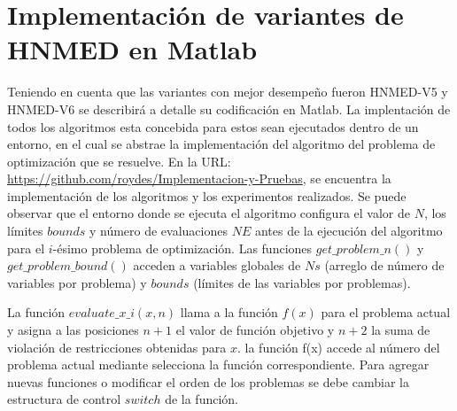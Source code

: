 
\chapter{Implementación de variantes de HNMED en Matlab} %

\label{AppendixA} %

Teniendo en cuenta que las variantes con mejor desempeño fueron HNMED-V5 y HNMED-V6 se describirá a detalle su codificación en Matlab. La implentación de todos los algoritmos esta concebida para estos sean ejecutados dentro de un entorno, en el cual se abstrae la implementación del algoritmo del problema de optimización que se resuelve. En la URL:  \url{https://github.com/roydes/Implementacion-y-Pruebas}, se encuentra la implementación de los algoritmos y los experimentos realizados. Se puede observar que el entorno donde se ejecuta el algoritmo configura el valor de $N$, los límites $bounds$ y número de evaluaciones $NE$ antes de la ejecución del algoritmo para el $i$-ésimo problema de optimización. Las funciones $get\_problem\_n()$ y $get\_problem\_bound()$ acceden a variables globales  de $Ns$ (arreglo de número de variables por problema) y $bounds$ (límites de las variables por problemas).

 La función $evaluate\_x\_i(x,n)$ llama a la función $f(x)$ para el problema actual y asigna a las posiciones $n+1$ el valor de función objetivo y $n+2$ la suma de violación de restricciones obtenidas para  $x$. la función f(x) accede al número del problema actual mediante selecciona la función correspondiente. Para agregar nuevas funciones o modificar el orden de los problemas se debe cambiar la estructura de control $switch$ de la función.
 
